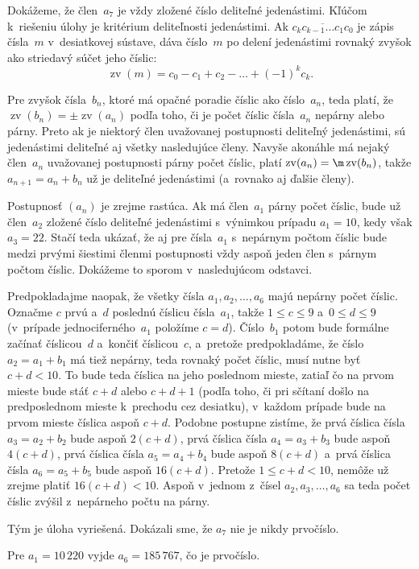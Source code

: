 {%
\def\zv{\operatorname{zv}}
Dokážeme, že člen~$a_7$ je vždy zložené číslo deliteľné jedenástimi.
Kľúčom k~riešeniu úlohy je kritérium deliteľnosti jedenástimi. Ak
$\overline{c_kc_{k-1}\dots c_1c_0}$ je zápis čísla~$m$ v~desiatkovej
sústave, dáva číslo~$m$ po delení jedenástimi rovnaký zvyšok
ako striedavý súčet jeho číslic:
$$
\zv(m)=c_0-c_1+c_2-\dots+(-1)^kc_k.
$$

Pre zvyšok čísla~$b_n$, ktoré má opačné poradie číslic ako
číslo~$a_n$, teda platí, že $\zv(b_n)=\pm\zv(a_n)$ podľa toho,
či je počet číslic čísla~$a_n$ nepárny alebo párny. Preto ak je niektorý
člen uvažovanej postupnosti deliteľný jedenástimi, sú jedenástimi
deliteľné aj všetky nasledujúce členy. Navyše akonáhle má nejaký
člen~$a_n$ uvažovanej postupnosti párny počet číslic, platí
$\zv(a_n)=\m\zv(b_n)$, takže $a_{n+1}=a_n+b_n$ už je deliteľné
jedenástimi (a~rovnako aj ďalšie členy).

Postupnosť $(a_n)$ je zrejme rastúca. Ak má člen~$a_1$ párny
počet číslic, bude už člen~$a_2$ zložené číslo deliteľné
jedenástimi s~výnimkou prípadu $a_1=10$, kedy však $a_3=22$. Stačí
teda ukázať, že aj pre čísla~$a_1$ s~nepárnym počtom číslic bude
medzi prvými šiestimi členmi postupnosti vždy aspoň jeden člen
s~párnym počtom číslic. Dokážeme to sporom v~nasledujúcom odstavci.

Predpokladajme naopak, že všetky čísla $a_1, a_2, \dots, a_6$
majú nepárny počet číslic. Označme $c$ prvú a~$d$ poslednú číslicu
čísla~$a_1$, takže $1\le c\le9$ a~$0\le d\le9$ (v~prípade
jednociferného~$a_1$ položíme $c=d$). Číslo~$b_1$ potom bude formálne
začínať číslicou~$d$ a~končiť číslicou~$c$, a~pretože
predpokladáme, že číslo $a_2=a_1+b_1$ má tiež nepárny, teda
rovnaký počet číslic, musí nutne byť $c+d<10$. To bude teda číslica na
jeho poslednom mieste, zatiaľ čo na prvom mieste bude stáť $c+d$
alebo $c+d+1$ (podľa toho, či pri sčítaní došlo na predposlednom
mieste k~prechodu cez desiatku), v~každom prípade bude na prvom
mieste číslica aspoň $c+d$. Podobne postupne zistíme, že prvá
číslica čísla $a_3=a_2+b_2$ bude aspoň $2(c+d)$, prvá číslica
čísla $a_4=a_3+b_3$ bude aspoň $4(c+d)$, prvá číslica čísla
$a_5=a_4+b_4$ bude aspoň $8(c+d)$ a~prvá číslica čísla
$a_6=a_5+b_5$ bude aspoň $16(c+d)$. Pretože $1\le c+d<10$, nemôže
už zrejme platiť $16(c+d)<10$. Aspoň v~jednom z~čísel
$a_2,a_3,\dots,a_6$ sa teda počet číslic zvýšil z~nepárneho počtu
na párny.

Tým je úloha vyriešená. Dokázali sme, že $a_7$ nie je nikdy
prvočíslo.

\poznamka
Pre $a_1=10\,220$ vyjde $a_6=185\,767$, čo je prvočíslo.}

